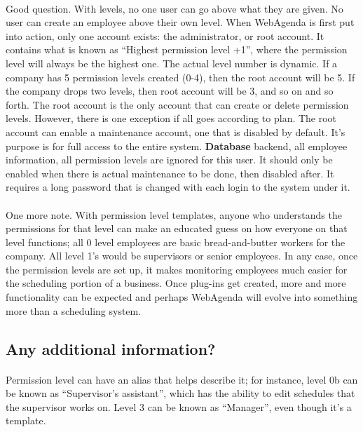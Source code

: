 \documentclass[letterpaper,12pt]{report}
\begin{document}
\paragraph*{}\hspace{0.6cm}Good question. With levels, no one user can go above what they are given. No user can create an employee above their own level. When WebAgenda is first put into action, only one account exists: the administrator, or root account. It contains what is known as “Highest permission level +1”, where the permission level will always be the highest one. The actual level number is dynamic. If a company has 5 permission levels created (0-4), then the root account will be 5. If the company drops two levels, then root account will be 3, and so on and so forth. The root account is the only account that can create or delete permission levels. However, there is one exception if all goes according to plan. The root account can enable a maintenance account, one that is disabled by default. It's purpose is for full access to the entire system. \textbf{Database} backend, all employee information, all permission levels are ignored for this user. It should only be enabled when there is actual maintenance to be done, then disabled after. It requires a long password that is changed with each login to the system under it. 
\paragraph*{}\hspace{0.6cm}One more note. With permission level templates, anyone who understands the permissions for that level can make an educated guess on how everyone on that level functions; all 0 level employees are basic bread-and-butter workers for the company. All level 1's would be supervisors or senior employees. 
In any case, once the permission levels are set up, it makes monitoring employees much easier for the scheduling portion of a business. Once plug-ins get created, more and more functionality can be expected and perhaps WebAgenda will evolve into something more than a scheduling system. 

\subsection*{Any additional information?}
\paragraph*{}\hspace{0.6cm}Permission level can have an alias that helps describe it; for instance, level 0b can be known as “Supervisor's assistant”, which has the ability to edit schedules that the supervisor works on. Level 3 can be known as “Manager”, even though it's a template. 
\end{document}
